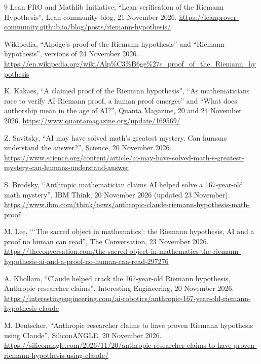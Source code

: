 \documentclass[11pt,a4paper]{article}
\begin{document}
\renewcommand{\refname}{Sources / Fuentes (all read on 24 November 2026 / todas leídas el 24 de noviembre de 2026)}
\begin{thebibliography}{9}\small
{} Lean FRO and Mathlib Initiative, ``Lean verification of the Riemann Hypothesis'', Lean community blog, 21 November 2026. \url{https://leanprover-community.github.io/blog/posts/riemann-hypothesis/}

 Wikipedia, ``Alpöge's proof of the Riemann hypothesis'' and ``Riemann hypothesis'', versions of 24 November 2026. \url{https://en.wikipedia.org/wiki/Alp%C3%B6ge%27s_proof_of_the_Riemann_hypothesis}

 K. Kakaes, ``A claimed proof of the Riemann hypothesis'', ``As mathematicians race to verify AI Riemann proof, a human proof emerges'' and ``What does authorship mean in the age of AI?'', Quanta Magazine, 20 and 24 November 2026. \url{https://www.quantamagazine.org/update/169569/}

 Z. Savitsky, ``AI may have solved math's greatest mystery. Can humans understand the answer?'', Science, 20 November 2026. \url{https://www.science.org/content/article/ai-may-have-solved-math-s-greatest-mystery-can-humans-understand-answer}

 S. Brodsky, ``Anthropic mathematician claims AI helped solve a 167-year-old math mystery'', IBM Think, 20 November 2026 (updated 23 November). \url{https://www.ibm.com/think/news/anthropic-claude-riemann-hypothesis-math-proof}

 M. Lee, ```The sacred object in mathematics': the Riemann hypothesis, AI and a proof no human can read'', The Conversation, 23 November 2026. \url{https://theconversation.com/the-sacred-object-in-mathematics-the-riemann-hypothesis-ai-and-a-proof-no-human-can-read-297276}

 A. Khollam, ``Claude helped crack the 167-year-old Riemann hypothesis, Anthropic researcher claims'', Interesting Engineering, 20 November 2026. \url{https://interestingengineering.com/ai-robotics/anthropic-167-year-old-riemann-hypothesis-claude}

 M. Deutscher, ``Anthropic researcher claims to have proven Riemann hypothesis using Claude'', SiliconANGLE, 20 November 2026. \url{https://siliconangle.com/2026/11/20/anthropic-researcher-claims-to-have-proven-riemann-hypothesis-using-claude/}

\end{thebibliography}
\end{document}
